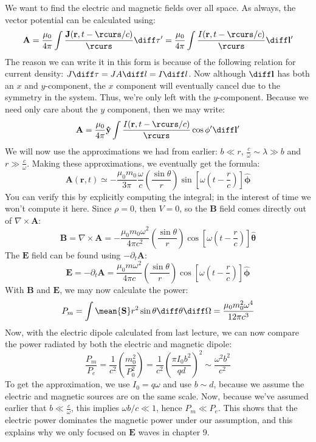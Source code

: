 We want to find the electric and magnetic fields over all space.
As always, the vector potential can be calculated using:
\[
	\mathbf{A} = \frac{\mu_0}{4\pi}\int \frac{\mathbf{J}(\mathbf{r}, t - \rcurs / c)}{\rcurs} \diff \tau' =
	\frac{\mu_0}{4\pi} \int \frac{I(\mathbf{r}, t - \rcurs / c)}{\rcurs} \diff \mathbf{l}'
\]
The reason we can write it in this form is because of the following relation for current density:
\( J \diff \tau = J A \diff l = I \diff l \). Now although \( \diff \mathbf{l} \) has both an \( x \) and \(
y\)-component, the \( x \) component will eventually cancel due to the symmetry in the system. Thus, we're
only left with the \( y \)-component. Because we need only care about the \( y \) component, then we may
write:
\[
	\mathbf{A} = \frac{\mu_0}{4\pi} \mathbf{\hat{y}} \int \frac{I(\mathbf{r}, t - \rcurs / c)}{\rcurs} \cos
	\phi' \diff \mathbf{l}'
\]
We will now use the approximations we had from earlier: \( b \ll r \), \( \frac{c}{\omega} \sim \lambda \gg b
\) and \( r \gg \frac{c}{\omega} \). Making these approximations, we eventually get the formula:
\[
	\mathbf{A}(\mathbf{r}, t) \simeq -\frac{\mu_0 m_0}{3\pi}\frac{\omega}{c}\left( \frac{\sin \theta}{r}
	\right) \sin\left[ \omega\left( t - \frac{r}{c} \right) \right]\boldsymbol{\hat{\phi}}
\]
You can verify this by explicitly computing the integral; in the interest of time we won't compute it here.
Since \( \rho = 0 \), then \( V = 0 \), so the \( \mathbf{B} \) field comes directly out of \( \nabla \times
\mathbf{A}\):
\[
	\mathbf{B} = \nabla \times \mathbf{A} = -\frac{\mu_0 m_0 \omega^2}{4 \pi c^2}\left( \frac{\sin \theta}{r}
	\right)\cos\left[ \omega\left( t - \frac{r}{c} \right) \right]\boldsymbol{\hat{\theta}}
\]
The \( \mathbf{E} \) field can be found using \( -\partial_t \mathbf{A} \):
\[
	\mathbf{E} = -\partial_t \mathbf{A} = \frac{\mu_0 m \omega^2}{4\pi c}\left(\frac{\sin \theta}{r}
	\right)\cos\left[ \omega\left( t - \frac{r}{c} \right) \right]\boldsymbol{\hat{\phi}}
\]
With \( \mathbf{B} \) and \( \mathbf{E} \), we may now calculate the power:
\[
	P_m = \int \mean{\mathbf{S}} r^2 \sin \theta \diff \theta \diff \Omega = \frac{\mu_0 m_0^2 \omega^{4}}{12
	\pi c^{3}}
\]
Now, with the electric dipole calculated from last lecture, we can now compare the power radiated by both the
electric and magnetic dipole:
\[
	\frac{P_m}{P_e} = \frac{1}{c^2}\left(\frac{m_0^2}{P_0^2}\right) = \frac{1}{c^2}\left( \frac{\pi I_0
	b^2}{qd} \right)^2 \sim \frac{\omega^2 b^2}{c^2}
\]
To get the approximation, we use \( I_0 = q \omega \) and use \( b \sim d \), because we assume the electric
and magnetic sources are on the same scale. Now, because we've assumed earlier that \( b \ll \frac{c}{\omega}
\), this implies \( \omega b / c \ll 1 \), hence \( P_m \ll P_e \). This shows that the electric power
dominates the magnetic power under our assumption, and this explains why we only focused on \( \mathbf{E} \)
waves in chapter 9.



